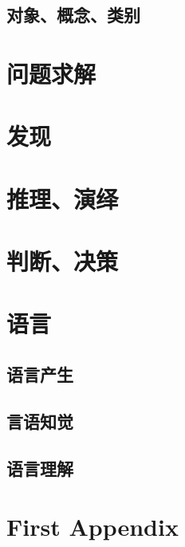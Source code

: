 \documentclass[a4paper,12pt]{article}
\begin{document}
\subsection{对象、概念、类别}

\section{问题求解}

\section{发现}

\section{推理、演绎}

\section{判断、决策}

\section{语言}

\subsection{语言产生}

\subsection{言语知觉}

\subsection{语言理解}

\appendix
\section{First Appendix}
\end{document}
